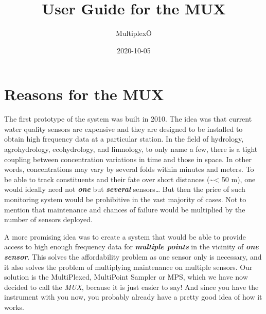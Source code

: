 \documentclass[]{book}
\title{User Guide for the MUX}
\author{MultiplexÔ}
\date{2020-10-05}
\begin{document}
\maketitle

{
\setcounter{tocdepth}{1}
\tableofcontents
}
\hypertarget{reasons-for-the-mux}{%
\chapter{Reasons for the MUX}\label{reasons-for-the-mux}}

The first prototype of the system was built in 2010. The idea was that current water quality sensors are expensive and they are designed to be installed to obtain high frequency data at a particular station. In the field of hydrology, agrohydrology, ecohydrology, and limnology, to only name a few, there is a tight coupling between concentration variations in time and those in space. In other words, concentrations may vary by several folds within minutes and meters. To be able to track constituents and their fate over short distances (\textasciitilde{}\textless{} 50 m), one would ideally need not \emph{\textbf{one}} but \emph{\textbf{several}} sensors\ldots{} But then the price of such monitoring system would be prohibitive in the vast majority of cases. Not to mention that maintenance and chances of failure would be multiplied by the number of sensors deployed.

A more promising idea was to create a system that would be able to provide access to high enough frequency data for \emph{\textbf{multiple points}} in the vicinity of \emph{\textbf{one sensor}}. This solves the affordability problem as one sensor only is necessary, and it also solves the problem of multiplying maintenance on multiple sensors. Our solution is the MultiPlexed, MultiPoint Sampler or MPS, which we have now decided to call the \emph{MUX}, because it is just easier to say! And since you have the instrument with you now, you probably already have a pretty good idea of how it works.
\end{document}
